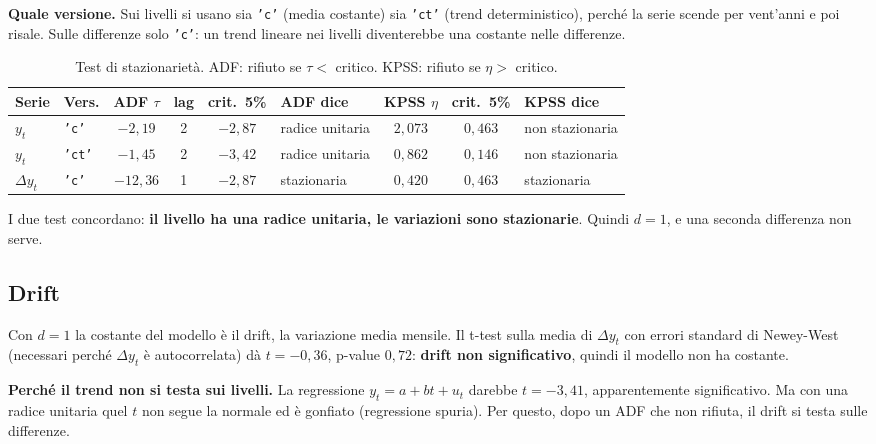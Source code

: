 \documentclass[11pt,a4paper]{article}
\begin{document}
\textbf{Quale versione.} Sui livelli si usano sia \texttt{'c'} (media costante) sia \texttt{'ct'} (trend deterministico), perché la serie scende per vent'anni e poi risale. Sulle differenze solo \texttt{'c'}: un trend lineare nei livelli diventerebbe una costante nelle differenze.

\begin{table}[H]
\centering
\small
\begin{tabular}{llcccl|ccl}
\toprule
Serie & Vers. & ADF $\tau$ & lag & crit.\ 5\% & ADF dice & KPSS $\eta$ & crit.\ 5\% & KPSS dice \\
\midrule
$y_t$ & \texttt{'c'} & $-2{,}19$ & 2 & $-2{,}87$ & radice unitaria & $2{,}073$ & $0{,}463$ & non stazionaria \\
$y_t$ & \texttt{'ct'} & $-1{,}45$ & 2 & $-3{,}42$ & radice unitaria & $0{,}862$ & $0{,}146$ & non stazionaria \\
$\Delta y_t$ & \texttt{'c'} & $-12{,}36$ & 1 & $-2{,}87$ & stazionaria & $0{,}420$ & $0{,}463$ & stazionaria \\
\bottomrule
\end{tabular}
\caption{Test di stazionarietà. ADF: rifiuto se $\tau <$ critico. KPSS: rifiuto se $\eta >$ critico.}
\end{table}

I due test concordano: \textbf{il livello ha una radice unitaria, le variazioni sono stazionarie}. Quindi $d = 1$, e una seconda differenza non serve.

\subsection{Drift}

Con $d = 1$ la costante del modello è il drift, la variazione media mensile. Il t-test sulla media di $\Delta y_t$ con errori standard di Newey-West (necessari perché $\Delta y_t$ è autocorrelata) dà $t = -0{,}36$, p-value $0{,}72$: \textbf{drift non significativo}, quindi il modello non ha costante.

\begin{nota}
\textbf{Perché il trend non si testa sui livelli.} La regressione $y_t = a + bt + u_t$ darebbe $t = -3{,}41$, apparentemente significativo. Ma con una radice unitaria quel $t$ non segue la normale ed è gonfiato (regressione spuria). Per questo, dopo un ADF che non rifiuta, il drift si testa sulle differenze.
\end{nota}

\end{document}
